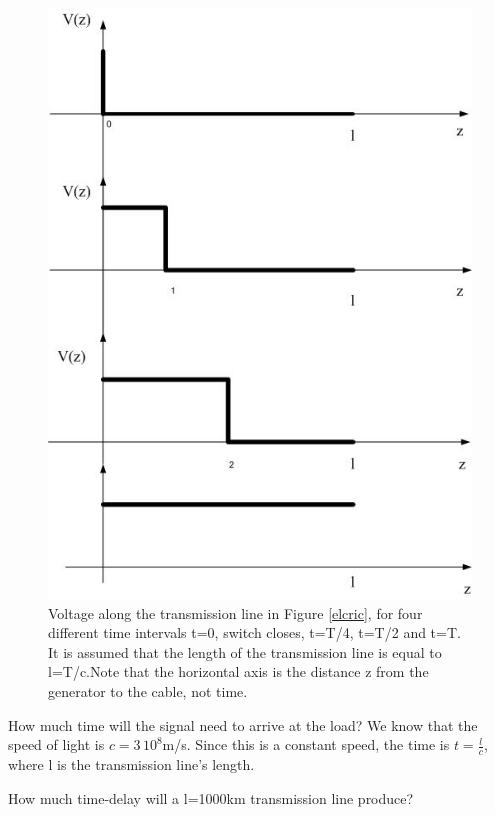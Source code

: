 \documentclass{ximera}
\begin{document}
\begin{figure}[htbp]
\begin{center}
\includegraphics[scale=0.5]{jpg/timedelayedsignaltl.jpg}
\end{center}
\caption{Voltage along the transmission line in Figure \ref{elcric}, for four different time intervals t=0, switch closes, t=T/4, t=T/2 and t=T. It is assumed that the length of the transmission line is equal to l=T/c.Note that the horizontal axis is the distance z from the generator to the cable, not time. }
\label{delayedsig}
\end{figure}

How much time will the signal need to arrive at the load? We know that the speed of light is $c=3\,10^8$m/s. Since this is a constant speed, the time is $t=\frac{l}{c}$, where l is the transmission line's length.

\begin{question}  
How much time-delay will a l=1000km transmission line produce?  
\begin{multipleChoice}  
\end{multipleChoice}  
\end{question} 
\end{document}

